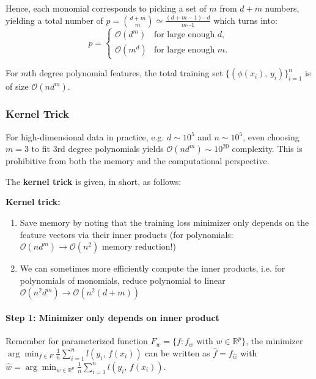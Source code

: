 \documentclass[a4paper]{extarticle}
\begin{document}
Hence, each monomial corresponds to picking a set of $m$ from $d + m$ numbers, yielding a total number of $p = \binom{d + m}{m} \simeq \frac{(d + m - 1) \cdots d}{m \cdots 1}$ which turns into:
\[
    p = \begin{cases}
        \mathcal{O}(d^m) &\text{for large enough } d,\\
        \mathcal{O}(m^d) &\text{for large enough } m.
    \end{cases}
\]

For $m$th degree polynomial features, the total training set $\{(\phi(x_i), \, y_i)\}_{i = 1}^n$ is of size $\mathcal{O}(nd^m)$.

\subsubsection{Kernel Trick}

For high-dimensional data in practice, e.g. $d \sim 10^5$ and $n \sim 10^5$, even choosing $m = 3$ to fit $3$rd degree polynomials yields $\mathcal{O}(nd^m) \sim 10^{20}$ complexity. This is prohibitive from both the memory and the computational perspective.

The \textbf{kernel trick} is given, in short, as follows:

\begin{cbox}
    \textbf{Kernel trick:}
    \begin{enumerate}
        \item Save memory by noting that the training loss minimizer only depends on the feature vectors via their inner products (for polynomials: $\mathcal{O}(nd^m) \to \mathcal{O}(n^2)$ memory reduction!)
        \item We can sometimes more efficiently compute the inner products, i.e. for polynomials of monomials, reduce polynomial to linear $\mathcal{O}(n^2d^m) \to \mathcal{O}(n^2(d + m))$
    \end{enumerate}
\end{cbox}

\paragraph{Step 1: Minimizer only depends on inner product} Remember for parameterized function $F_w = \{f : f_w \text{ with } w \in \mathbb{R}^p\}$, the minimizer $\arg \min_{f \in F} \frac{1}{n} \sum_{i = 1}^n l(y_i, \, f(x_i))$ can be written as $\hat{f} = f_{\hat{w}}$ with $\hat{w} = \arg \min_{w \in \mathbb{R}^p} \frac{1}{n} \sum_{i = 1}^n l(y_i, \, f(x_i))$.
\end{document}
